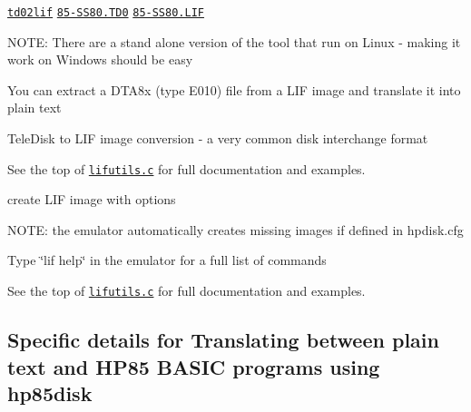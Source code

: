 \begin{DoxyItemize}
\item \href{lif/t202lif}{\tt td02lif} \href{lif/85-SS80.TD0}{\tt 85-\/\+S\+S80.\+T\+D0} \href{lif/85-SS80.LIF}{\tt 85-\/\+S\+S80.\+L\+IF}
\item N\+O\+TE\+: There are a stand alone version of the tool that run on Linux -\/ making it work on Windows should be easy
\begin{DoxyItemize}
\item You can extract a D\+T\+A8x (type E010) file from a L\+IF image and translate it into plain text
\end{DoxyItemize}
\item Tele\+Disk to L\+IF image conversion -\/ a very common disk interchange format
\begin{DoxyItemize}
\item See the top of \href{lif/lifutils.c}{\tt lifutils.\+c} for full documentation and examples.
\item create L\+IF image with options
\item N\+O\+TE\+: the emulator automatically creates missing images if defined in hpdisk.\+cfg
\begin{DoxyItemize}
\item Type \char`\"{}lif help\char`\"{} in the emulator for a full list of commands
\item See the top of \href{lif/lifutils.c}{\tt lifutils.\+c} for full documentation and examples.
\end{DoxyItemize}
\end{DoxyItemize}
\end{DoxyItemize}





\subsection*{Specific details for Translating between plain text and H\+P85 B\+A\+S\+IC programs using hp85disk}


